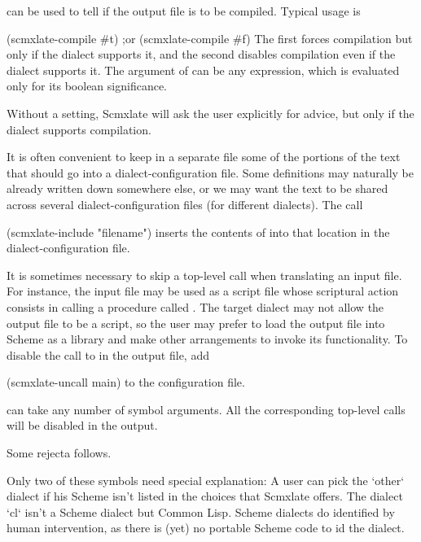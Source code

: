  can be used to tell if the output
file is to be compiled.  Typical usage is

\begintts
(scmxlate-compile #t)      ;or
(scmxlate-compile #f)
\endtt
The first forces compilation but only if the dialect
supports it, and the second disables compilation even
if the dialect supports it.  The argument of
 can be any expression, which is
evaluated only for its boolean significance.

Without a  setting, Scmxlate will
ask the user explicitly for advice, but only if
the dialect supports compilation.


It is often convenient to keep in a separate file some
of the portions of the text that should go into a
dialect-configuration file.  Some definitions may
naturally be already written down somewhere else, or
we may want the text to be shared across several
dialect-configuration files (for different dialects).
The call

\begintts
(scmxlate-include "filename")
\endtt
inserts the contents of 
into that location in the dialect-configuration file.


It is sometimes necessary to skip a top-level
call when translating an input file.  For instance,
the input file may be used as a script file whose
scriptural action consists in calling a procedure
called .  The target dialect may not allow
the output file to be a script, so the user may prefer
to load the output file into Scheme as a library
and make other arrangements to invoke its
functionality.  To disable the call to 
in the output file, add

\begintts
(scmxlate-uncall main)
\endtt
to the configuration file.

 can take any number of symbol
arguments.  All the corresponding top-level calls
will be disabled in the output.

\bye

Some rejecta follows.

Only two of these symbols need special explanation: A
user can pick the `other` dialect if his Scheme isn’t
listed in the choices that Scmxlate offers.  The
dialect `cl` isn’t a Scheme dialect but Common Lisp.
Scheme dialects do identified  by human
intervention, as there is (yet) no portable Scheme code
to id the dialect.

